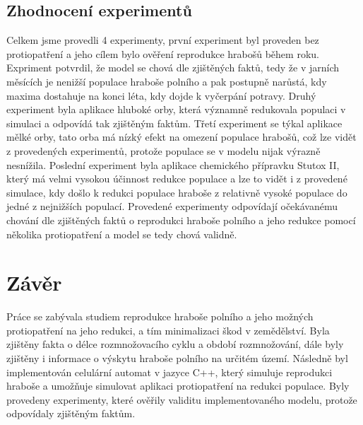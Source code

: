 \documentclass[a4paper,11pt]{article}
\begin{document}
\newpage


\subsection{Zhodnocení experimentů}
Celkem jsme provedli 4 experimenty, první experiment byl proveden bez protiopatření a jeho cílem bylo ověření reprodukce hrabošů během roku. Expriment potvrdil, že model se chová dle zjištěných faktů, tedy že v jarních měsících je nenižší populace hraboše polního a pak postupně narůstá, kdy maxima dostahuje na konci léta, kdy dojde k vyčerpání potravy. Druhý experiment byla aplikace hluboké orby, která významně redukovala populaci v simulaci a odpovídá tak zjištěným faktům. Třetí experiment se týkal aplikace mělké orby, tato orba má nízký efekt na omezení populace hrabošů, což lze vidět z provedených experimentů, protože populace se v modelu nijak výrazně nesnížila. Poslední experiment byla aplikace chemického přípravku Stutox II, který má velmi vysokou účinnost redukce populace a lze to vidět i z provedené simulace, kdy došlo k redukci populace hraboše z relativně vysoké populace do jedné z nejnižších populací. Provedené experimenty odpovídají očekávanému chování dle zjištěných faktů o reprodukci hraboše polního a jeho redukce pomocí několika protiopatření a model se tedy chová validně.

\section{Závěr}
Práce se zabývala studiem reprodukce hraboše polního a jeho možných protiopatření na jeho redukci, a tím minimalizaci škod v zemědělství. Byla zjištěny fakta o délce rozmnožovacího cyklu a období rozmnožování, dále byly zjištěny i informace o výskytu hraboše polního na určitém území. Následně byl implementován celulární automat v jazyce C++, který simuluje reprodukci hraboše a umožňuje simulovat aplikaci protiopatření na redukci populace. Byly provedeny experimenty, které ověřily validitu implementovaného modelu, protože odpovídaly zjištěným faktům.

\newpage

\renewcommand{\refname}{\section{Literatura}}

\end{document}

